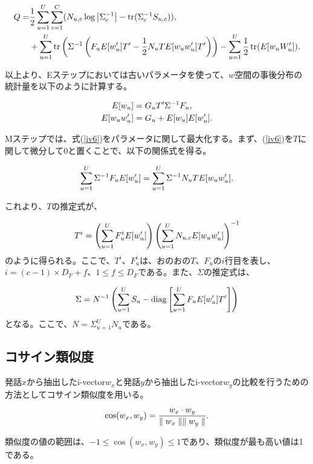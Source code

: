 \begin{align}
Q=&\frac{1}{2}\sum_{u=1}^{U}\sum_{c=1}^{C}(N_{u,c} \log\left|\Sigma_c^{-1}\right|-\tr(\Sigma_c^{-1}S_{u,c})), \notag  \\
&+\sum_{u=1}^{U}\tr\left( \Sigma^{-1}\left( F_uE[w_u^\prime]T^\prime -\frac{1}{2}N_uTE[w_uw_u^\prime]T^\prime \right) \right) -\sum_{u=1}^{U}\frac{1}{2}\tr(E[w_uW_u^\prime]). \label{iv6}
\end{align}

以上より、Eステップにおいては古いパラメータを使って、$w$空間の事後分布の統計量を以下のように計算する。

\begin{align}
E[w_u] &=G_uT^\prime\Sigma^{-1}F_u, \notag \\
E[w_uw_u^\prime] &=G_u+E[w_u]E[w_u^\prime]. \notag
\end{align}

Mステップでは、式(\ref{iv6})をパラメータに関して最大化する。まず、(\ref{iv6})を$T$に関して微分して0と置くことで、以下の関係式を得る。

\begin{equation}
\sum_{u=1}^{U}\Sigma^{-1}F_uE[w_u^\prime]=\sum_{u=1}^{U}\Sigma^{-1}N_uTE[w_uw_u^\prime]. \notag
\end{equation}

これより、$T$の推定式が、

\begin{equation}
T^i=\left(\sum_{u=1}^{U}F_u^iE[w_u^\prime] \right)\left(\sum_{u=1}^{U}N_{u,c}E[w_uw_u^\prime] \right)^{-1} \notag
\end{equation}
のように得られる。ここで、$T^i$、$F_u^i$は、おのおの$T$、$F_u$の$i$行目を表し、$i=(c-1)\times D_F+f$、$1\leq f\leq D_F$である。また、$\Sigma$の推定式は、

\begin{equation}
\Sigma=N^{-1}\left(\sum_{u=1}^{U}S_u-\diag\left[\sum_{u=1}^{U}F_uE[w_u^\prime]T^\prime \right] \right) \notag
\end{equation}
となる。ここで、$N=\Sigma_{u=1}^{U}N_u$である。

\subsection{コサイン類似度}
発話$x$から抽出したi-vector$w_x$と発話$y$から抽出したi-vector$w_y$の比較を行うための方法としてコサイン類似度を用いる。

\begin{equation}
\cos(w_x,w_y)=\frac{w_x\cdot w_y}{\parallel w_x\parallel\parallel w_y\parallel}. \notag
\end{equation}

類似度の値の範囲は、$-1\leq \cos(w_x,w_y)\leq 1$であり、類似度が最も高い値は1である。

